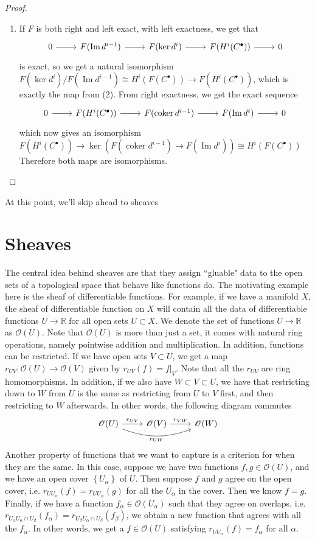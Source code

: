 \documentclass[psamsfonts]{amsart}
\theoremstyle{definition}
\theoremstyle{remark}
\renewcommand{\O}{\mathscr{O}}
\newcommand{\R}{\mathbb{R}}
\newcommand{\set}[1]{\left\lbrace #1 \right\rbrace}
\DeclareMathOperator{\im}{Im}
\DeclareMathOperator{\coker}{coker}
\begin{document}
\begin{proof}
\begin{enumerate}
\item If $F$ is both right and left exact, with left exactness, we get that 
$$\begin{tikzcd}
0 \ar[r] & F(\im d^{i-1}) \ar[r] & F(\ker d^i) \ar[r] & F(H^i(C^\bullet)) \ar[r] & 0
\end{tikzcd}$$
is exact, so we get a natural isomorphism $F(\ker d^i) / F(\im d^{i-1}) \cong H^i(F(C^\bullet)) \to F(H^i(C^\bullet))$, which is exactly the map from (2). From right exactness, we get the exact sequence
$$\begin{tikzcd}
0 \ar[r] & F(H^i(C^\bullet)) \ar[r] & F(\coker d^{i-1}) \ar[r] & F(\im d^i) \ar[r] & 0
\end{tikzcd}$$
which now gives an isomorphism $F(H^i(C^\bullet)) \to \ker (F(\coker d^{i-1}) \to F(\im d^i)) \cong H^i(F(C^\bullet))$ 
Therefore both maps are isomorphisms.
\end{enumerate}
\end{proof}
%
At this point, we'll skip ahead to sheaves
%
\section*{Sheaves}
%
The central idea behind sheaves are that they assign ``gluable" data to the open sets of a topological space that behave like functions do. The motivating example here is the sheaf of differentiable functions. For example, if we have a manifold $X$, the sheaf of differentiable function on $X$ will contain all the data of differentiable functions $U \to \R$ for all open sets $U \subset X$. We denote the set of functions $U \to \R$ as $\O(U)$. Note that $\O(U)$ is more than just a set, it comes with natural ring operations, namely pointwise addition and multiplication. In addition, functions can be restricted. If we have open sets $V \subset U$, we get a map $r_{UV}: \O(U) \to \O(V)$ given by $r_{UV}(f) = f\big\vert_V$. Note that all the $r_{UV}$ are ring homomorphisms. In addition, if we also have $W \subset V \subset U$, we have that restricting down to $W$ from $U$ is the same as restricting from $U$ to $V$ first, and then restricting to $W$ afterwards. In other words, the following diagram commutes
$$\begin{tikzcd}
\O(U) \ar[r, "r_{UV}"] \ar[rr, bend right=20, "r_{UW}"'] & \O(V) \ar[r, "r_{VW}"]& \O(W)
\end{tikzcd}$$
Another property of functions that we want to capture is a criterion for when they are the same. In this case, suppose we have two functions $f,g \in \O(U)$, and we have an open cover $\set{U_\alpha}$ of $U$. Then suppose $f$ and $g$ agree on the open cover, i.e. $r_{UU_\alpha}(f) = r_{UU_\alpha}(g)$ for all the $U_\alpha$ in the cover. Then we know $f = g$. Finally, if we have a function $f_\alpha \in \O(U_\alpha)$ such that they agree on overlaps, i.e. $r_{U_\alpha U_\alpha \cap U_\beta}(f_\alpha) = r_{U_\beta U_\alpha \cap U_\beta}(f_\beta)$, we obtain a new function that agrees with all the $f_\alpha$. In other words, we get a $f \in \O(U)$ satisfying $r_{UU_\alpha}(f) = f_\alpha$ for all $\alpha$.
\end{document}
